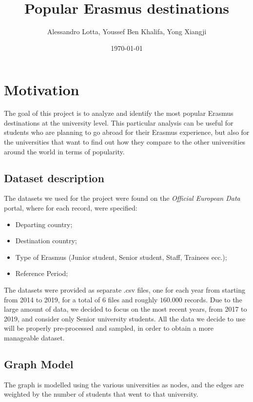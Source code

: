 
\usepackage{hyperref}
\title{Popular Erasmus destinations}
\author{Alessandro Lotta, Youssef Ben Khalifa, Yong Xiangji}
\date{\today}

\maketitle \tableofcontents 
\listofalgorithms
\newpage
\section{Motivation}
    The goal of this project is to analyze and identify the most popular Erasmus destinations at the university level. This particular analysis
    can be useful for students who are planning to go abroad for their Erasmus experience, but also for the universities that want to find out 
    how they compare to the other universities around the world in terms of popularity. 
\subsection{Dataset description}
    The datasets we used for the project were found on the \textit{Official European Data} portal, where for each record, were specified:
    \begin{itemize}
        \item Departing country;
        \item Destination country;
        \item Type of Erasmus (Junior student, Senior student, Staff, Trainees ecc.);
        \item Reference Period;
    \end{itemize}
    The datasets were provided as separate .csv files, one for each year from starting from 2014 to 2019, for a total of 6 files and roughly $160.000$ records.
    Due to the large amount of data, we decided to focus on the most recent years, from 2017 to 2019, and consider only Senior university students. All the data we decide 
    to use will be properly pre-processed and sampled, in order to obtain a more manageable dataset. 
\subsection{Graph Model}
    The graph is modelled using the various universities as nodes, and the edges are weighted by the number of students that went to that university.

